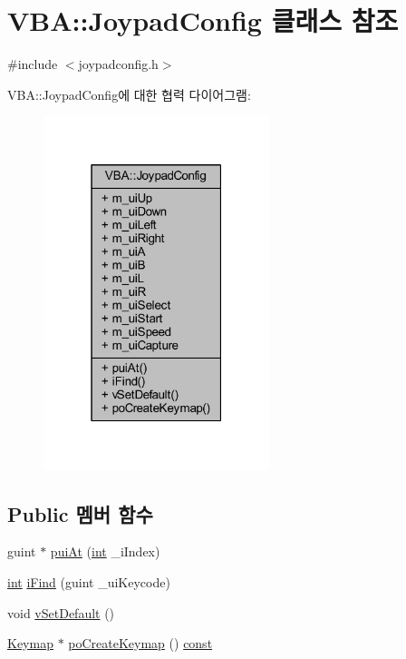 \hypertarget{class_v_b_a_1_1_joypad_config}{}\section{V\+BA\+:\+:Joypad\+Config 클래스 참조}
\label{class_v_b_a_1_1_joypad_config}


{\ttfamily \#include $<$joypadconfig.\+h$>$}



V\+BA\+:\+:Joypad\+Config에 대한 협력 다이어그램\+:\nopagebreak
\begin{figure}[H]
\begin{center}
\leavevmode
\includegraphics[width=187pt]{class_v_b_a_1_1_joypad_config__coll__graph}
\end{center}
\end{figure}
\subsection*{Public 멤버 함수}
\begin{DoxyCompactItemize}
\item 
guint $\ast$ \mbox{\hyperlink{class_v_b_a_1_1_joypad_config_afa304227fa214176c874619365ffc445}{pui\+At}} (\mbox{\hyperlink{_util_8cpp_a0ef32aa8672df19503a49fab2d0c8071}{int}} \+\_\+i\+Index)
\item 
\mbox{\hyperlink{_util_8cpp_a0ef32aa8672df19503a49fab2d0c8071}{int}} \mbox{\hyperlink{class_v_b_a_1_1_joypad_config_a27d56b77293ce938b1a6437a384d625d}{i\+Find}} (guint \+\_\+ui\+Keycode)
\item 
void \mbox{\hyperlink{class_v_b_a_1_1_joypad_config_af9f282b555d910519ce2fa03d5c66dda}{v\+Set\+Default}} ()
\item 
\mbox{\hyperlink{class_v_b_a_1_1_keymap}{Keymap}} $\ast$ \mbox{\hyperlink{class_v_b_a_1_1_joypad_config_a959ba3641c366cf9acae6bf03990fcfb}{po\+Create\+Keymap}} () \mbox{\hyperlink{getopt1_8c_a2c212835823e3c54a8ab6d95c652660e}{const}}
\end{DoxyCompactItemize}
